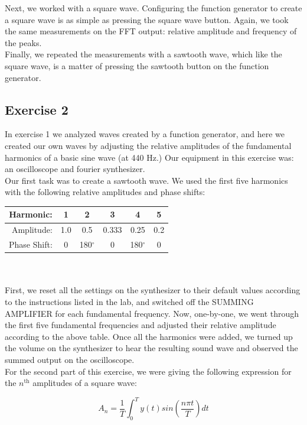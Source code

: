 \documentclass[a4paper,12pt]{article}
\begin{document}
Next, we worked with a square wave. Configuring the function generator
to create a square wave is as simple as pressing the square wave
button. Again, we took the same measurements on the FFT output:
relative amplitude and frequency of the peaks. \\ 

Finally, we repeated the measurements with a sawtooth wave, which like
the square wave, is a matter of pressing the sawtooth button on the
function generator.

\subsection{Exercise 2}
In exercise 1 we analyzed waves created by a function generator, and
here we created our own waves by adjusting the relative amplitudes of
the fundamental harmonics of a basic sine wave (at 440 Hz.) Our
equipment in this exercise was: an oscilloscope and fourier
synthesizer. \\

Our first task was to create a sawtooth wave. We used the first five
harmonics with the following relative amplitudes and phase shifts: \\

\begin{tabular}{r | c c c c c}
  Harmonic: & 1 & 2 & 3 & 4 & 5 \\
  \hline
  Amplitude: & 1.0 & 0.5 & 0.333 & 0.25 & 0.2 \\
  Phase Shift: & 0 & 180$^{\circ}$ & 0 & 180$^{\circ}$ & 0 \\
\end{tabular} \\ \\

First, we reset all the settings on the synthesizer to their default
values according to the instructions listed in the lab, and switched
off the SUMMING AMPLIFIER for each fundamental frequency. Now,
one-by-one, we went through the first five fundamental frequencies and
adjusted their relative amplitude according to the above table. Once
all the harmonics were added, we turned up the volume on the
synthesizer to hear the resulting sound wave and observed the summed
output on the oscilloscope. \\

For the second part of this exercise, we were giving the following
expression for the $n^{\text{th}}$ amplitudes of a square wave: 

\begin{center}
  \[A_n = \frac{1}{T} \int_0^T y(t) sin(\frac{n{\pi}t}{T})dt\]
\end{center}
\end{document}
